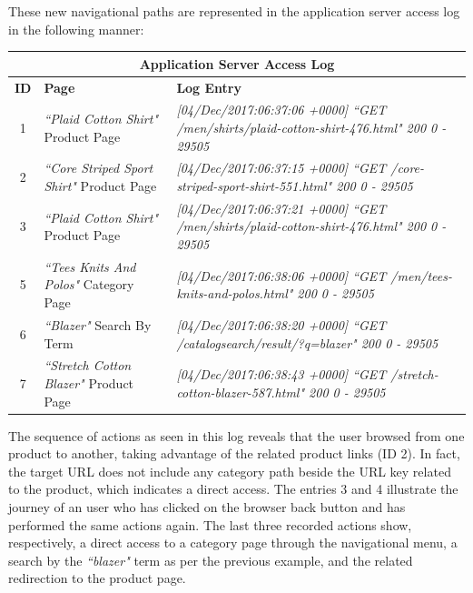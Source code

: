 These new navigational paths are represented in the application server access log in the following manner: 

\vspace{0.5cm}
\begin{center}
  \begin{tabular}{|c|p{3cm}|p{10cm}|}
  \hline
  \multicolumn{3}{|c|}{Application Server Access Log}\\ \hline
  \textbf{ID}&\textbf{Page}&\textbf{Log Entry}   \\ \hline
  1&\textit{``Plaid Cotton Shirt"} Product Page&\em[04/Dec/2017:06:37:06 +0000] 
  ``GET /men/shirts/plaid-cotton-shirt-476.html" 200 0 - 29505
  \\ \hline
  2&\textit{``Core Striped Sport Shirt"} Product Page &\em [04/Dec/2017:06:37:15 +0000] ``GET /core-striped-sport-shirt-551.html" 200 0 - 29505
  \\ \hline
  3&\textit{``Plaid Cotton Shirt"} Product Page &\em[04/Dec/2017:06:37:21 +0000] ``GET /men/shirts/plaid-cotton-shirt-476.html" 200 0 - 29505
  \\ \hline
  5&\textit{``Tees Knits And Polos"} Category Page &\em[04/Dec/2017:06:38:06 +0000] ``GET /men/tees-knits-and-polos.html" 200 0 - 29505
  \\ \hline
  6&\textit{``Blazer"} Search By Term&\em[04/Dec/2017:06:38:20 +0000] ``GET /catalogsearch/result/?q=blazer" 200 0 - 29505
  \\ \hline
  7&\textit{``Stretch Cotton Blazer"} Product Page &\em[04/Dec/2017:06:38:43 +0000] ``GET /stretch-cotton-blazer-587.html" 200 0 - 29505
  \\ \hline
  \end{tabular}
  \end{center}
\vspace{0.5cm}

The sequence of actions as seen in this log reveals that the user browsed from one product to another, taking advantage of the related product links (ID 2). In fact, the target URL does not include any category path beside the URL key related to the product, which indicates a direct access. The entries 3 and 4 illustrate the journey of an user who has clicked on the browser back button and has performed the same actions again. The last three recorded actions show, respectively, a direct access to a category page through the navigational menu, a search by the \textit{``blazer"} term as per the previous example, and the related redirection to the product page.

